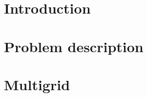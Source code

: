\documentclass[12pt,MSc,twoside]{muthesis}
\begin{document}
\iffalse 
	 
\fi


\chapter{Introduction}


\chapter{Problem description}

\chapter{Multigrid}




\end{document}
